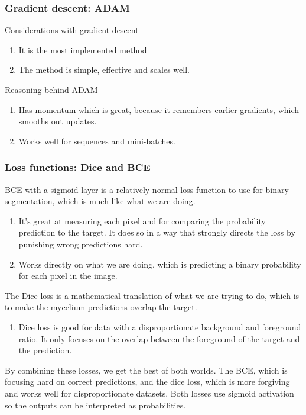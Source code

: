 \documentclass[a4paper,12pt]{article}
\begin{document}
\subsubsection{Gradient descent: ADAM}
Considerations with gradient descent
\begin{enumerate}
 \item It is the most implemented method
 \item The method is simple, effective and scales well.
\end{enumerate}
Reasoning behind ADAM
\begin{enumerate}
 \item Has momentum which is great, because it remembers earlier gradients, which smooths out updates.
 \item Works well for sequences and mini-batches.
\end{enumerate}

\subsubsection{Loss functions: Dice and BCE}
BCE with a sigmoid layer is a relatively normal loss function to use for binary segmentation, which is much like what we are doing.
\begin{enumerate}
 \item It's great at measuring each pixel and for comparing the probability prediction to the target. It does so in a way that strongly directs the loss by punishing wrong predictions hard.
 \item Works directly on what we are doing, which is predicting a binary probability for each pixel in the image.
\end{enumerate}
The Dice loss is a mathematical translation of what we are trying to do, which is to make the mycelium predictions overlap the target.
\begin{enumerate}
 \item Dice loss is good for data with a disproportionate background and foreground ratio. It only focuses on the overlap between the foreground of the target and the prediction.
\end{enumerate}
By combining these losses, we get the best of both worlds. The BCE, which is focusing hard on correct predictions, and the dice loss, which is more forgiving and works well for disproportionate datasets. Both losses use sigmoid activation so the outputs can be interpreted as probabilities.
\end{document}

